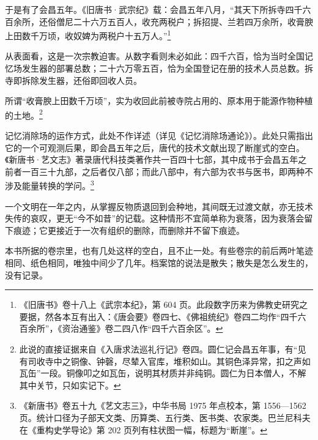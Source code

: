 于是有了会昌五年。《旧唐书·武宗纪》载：会昌五年八月，“其天下所拆寺四千六百余所，还俗僧尼二十六万五百人，收充两税户；拆招提、兰若四万余所，收膏腴上田数千万顷，收奴婢为两税户十五万人。”\footnote{《旧唐书》卷十八上《武宗本纪》，第 604 页。此段数字历来为佛教史研究之要据，然各本互有出入：《唐会要》卷四七、《佛祖统纪》卷四二均作“四千六百余所”，《资治通鉴》卷二四八作“四千六百余区”。}

从表面看，这是一次宗教迫害。从数字看则未必如此：四千六百，恰为当时全国记忆场发生器的部署总数；二十六万零五百，恰为全国登记在册的技术人员总数。拆寺即拆除发生器，还俗即回收人员。

所谓“收膏腴上田数千万顷”，实为收回此前被寺院占用的、原本用于能源作物种植的土地。\footnote{此说的直接证据来自《入唐求法巡礼行记》卷四。圆仁记会昌五年事，有“见有司收寺中之铜像、钟磬，尽辇入官库，堆积如山。其铜色泽异常，扣之声如瓦缶”一段。铜像叩之如瓦缶，说明其材质并非纯铜。圆仁为日本僧人，不解其中关节，只如实记下。}

记忆消除场的运作方式，此处不作详述（详见《记忆消除场通论》）。此处只需指出它的一个可观测后果，即会昌五年之后，唐代的技术文献出现了断崖式的空白。《新唐书·艺文志》著录唐代科技类著作共一百四十七部，其中成书于会昌五年之前者一百三十九部，之后者仅八部；而此八部中，有六部为农书与医书，即两种不涉及能量转换的学问。\footnote{《新唐书》卷五十九《艺文志三》，中华书局 1975 年点校本，第 1556—1562 页。统计口径为子部天文类、历算类、五行类、医书类、农家类。巴兰尼科夫在《重构史学导论》第 202 页列有柱状图一幅，标题为“断崖”。}

一个文明在一年之内，从掌握反物质退回到会种地，其间既无过渡文献，亦无技术失传的哀叹，更无“今不如昔”的记载。这种情形不宜简单称为衰落，因为衰落会留下痕迹；它更接近于一次有组织的删除，而删除并不留下痕迹。

本书所据的卷宗里，也有几处这样的空白，且不止一处。有些卷宗的前后两叶笔迹相同、纸色相同，唯独中间少了几年。档案馆的说法是散失；散失是怎么发生的，没有记录。

